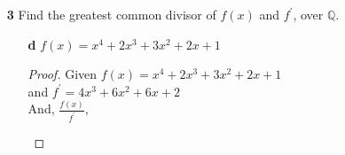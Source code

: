 \documentclass[paper=usletter, fontsize=12pt]{article}
\begin{document}
\begin{enumerate}
\begin{enumerate}
\begin{enumerate}
\begin{proof}
                    \begin{equation*}
                        \begin{array}{*2r @{\hskip\arraycolsep}c@{\hskip\arraycolsep} *5r}
                            &    &&    x^3 &  && +2x & +3 \\
                            \cline{3-8}
                            & x^2 &\big)& x^5 & +2x^3 &+3x^2 &+x &+4 \\
                            &    &&  x^5 \\
                            \cline{4-5}
                            &    &&   &  2x^3 \\
                            &    &&   &  2x^3 & \\
                            \cline{5-6}
                            &    &&    &    &  3x^2 \\
                            &    &&    &    &  3x^2 & +x & +4 \\
                            \cline{6-8}
                            &    &&    &    &  & +x & +4\\
                        \end{array}
                    \end{equation*}

                    Therefore,
                    \begin{align*}
                        f(x) & = g(x)(x^3+2x+3) + (x+4)\\
                        & = (x^2)(x^3+2x+3) + (x+4) \Mod{\mathbb{Z}_5} \qedhere
                    \end{align*}

                \end{proof}

            \end{enumerate}

            \item[\textbf{3}] Find the greatest common divisor of $f(x)$ and
            $f^\prime$, over $\mathbb{Q}$.
            \begin{enumerate}

                \item[\textbf{d}] $f(x) = x^4+2x^3+3x^2+2x+1$
                \begin{proof}

                    Given $f(x) = x^4+2x^3+3x^2+2x+1$\\
                    and $f^\prime = 4x^3+6x^2+6x+2$\\
                    And, $\frac{f(x)}{f^\prime}$,\\
                    \begin{center}


\end{center}
\end{proof}
\end{enumerate}
\end{enumerate}
\end{enumerate}
\end{document}
